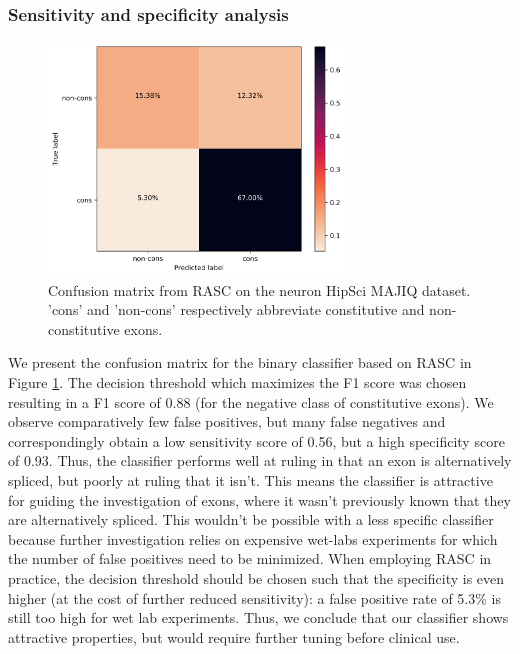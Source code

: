 \subsubsection{Sensitivity and specificity analysis}
\begin{figure}
	\centering\includegraphics[width=0.7\textwidth]{../visualizations/ch5-results/confusion_matrix.png} 
	\caption{Confusion matrix from RASC on the neuron HipSci MAJIQ dataset. 'cons' and 'non-cons' respectively abbreviate constitutive and non-constitutive exons. }
	\label{fig:confusion_matrix}
\end{figure}

We present the confusion matrix for the binary classifier based on RASC in Figure \ref{fig:confusion_matrix}. The decision threshold which maximizes the F1 score was chosen resulting in a F1 score of 0.88 (for the negative class of constitutive exons). We observe comparatively few false positives, but many false negatives and correspondingly obtain a low sensitivity score of 0.56, but a high specificity score of 0.93. Thus, the classifier performs well at ruling in that an exon is alternatively spliced, but poorly at ruling that it isn't. This means the classifier is attractive for guiding the investigation of exons, where it wasn't previously known that they are alternatively spliced. This wouldn't be possible with a less specific classifier because further investigation relies on expensive wet-labs experiments for which the number of false positives need to be minimized. When employing RASC in practice, the decision threshold should be chosen such that the specificity is even higher (at the cost of further reduced sensitivity): a false positive rate of 5.3\% is still too high for wet lab experiments. Thus, we conclude that our classifier shows attractive properties, but would require further tuning before clinical use. 


